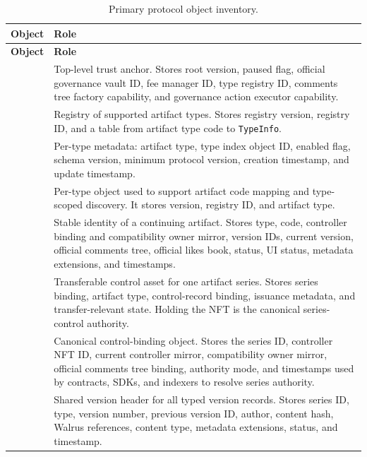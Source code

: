 \documentclass[11pt]{article}
\newcommand{\code}[1]{\texttt{#1}}
\newcommand{\breakcode}[1]{\begingroup\ttfamily\small\seqsplit{#1}\endgroup}
\begin{document}
\begin{longtable}{>{\raggedright\arraybackslash}p{}>{\raggedright\arraybackslash}p{}}
\caption{Primary protocol object inventory.}
\label{tab:object-inventory}\\
\toprule
\textbf{Object} & \textbf{Role} \\
\midrule
\endfirsthead
\toprule
\textbf{Object} & \textbf{Role} \\
\midrule
\endhead
\breakcode{PaperProofRoot} & Top-level trust anchor. Stores root version, paused flag, official governance vault ID, fee manager ID, type registry ID, comments tree factory capability, and governance action executor capability. \\
\breakcode{TypeRegistry} & Registry of supported artifact types. Stores registry version, registry ID, and a table from artifact type code to \code{TypeInfo}. \\
\breakcode{TypeInfo} & Per-type metadata: artifact type, type index object ID, enabled flag, schema version, minimum protocol version, creation timestamp, and update timestamp. \\
\breakcode{TypeIndex} & Per-type object used to support artifact code mapping and type-scoped discovery. It stores version, registry ID, and artifact type. \\
\breakcode{ArtifactSeries} & Stable identity of a continuing artifact. Stores type, code, controller binding and compatibility owner mirror, version IDs, current version, official comments tree, official likes book, status, UI status, metadata extensions, and timestamps. \\
\breakcode{ControllerNFT} & Transferable control asset for one artifact series. Stores series binding, artifact type, control-record binding, issuance metadata, and transfer-relevant state. Holding the NFT is the canonical series-control authority. \\
\breakcode{ArtifactControlRecord} & Canonical control-binding object. Stores the series ID, controller NFT ID, current controller mirror, compatibility owner mirror, official comments tree binding, authority mode, and timestamps used by contracts, SDKs, and indexers to resolve series authority. \\
\breakcode{CommonArtifactHeader} & Shared version header for all typed version records. Stores series ID, type, version number, previous version ID, author, content hash, Walrus references, content type, metadata extensions, status, and timestamp. \\

\end{longtable}
\end{document}

